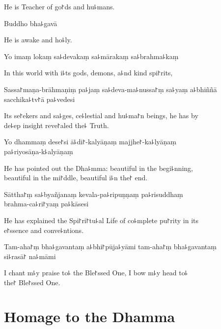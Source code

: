 \begin{english}
  He is Teacher of go꜓ds and hu꜕mans.
\end{english}

Buddho bha꜕gavā

\begin{english}
  He is awake and ho꜕ly.
\end{english}

Yo imaṃ lokaṃ sa꜕devakaṃ sa꜕mārakaṃ sa꜕brahma꜕kaṃ

\begin{english}
  In this world with i꜕ts gods, demons, a꜕nd kind spi꜓rits,
\end{english}

Sassa꜓maṇa-brāhmaṇiṃ pa꜕jaṃ sa꜕deva-ma꜕nussa꜓ṃ sa꜕yaṃ a꜕bhiññā sacchika꜕tv꜓ā pa꜕vedesi

\begin{english}
  Its se꜓ekers and sa꜕ges, ce꜕lestial and hu꜕ma꜓n beings, he has by \\de꜕ep insight reve꜓aled the꜕ Truth.
\end{english}

Yo dhammaṃ dese꜓si ā꜕di꜓-kalyāṇaṃ majjhe꜓-ka꜕lyāṇaṃ \\pa꜕riyosāṇa-k꜕alyāṇaṃ

\begin{english}
  He has pointed out the Dha꜕mma: beautiful in the begi꜕nning, \\beautiful in the mi꜓ddle, beautiful i꜕n the꜓ end.
\end{english}

Sāttha꜓ṃ sa꜕byañjanaṃ kevala-pa꜕ripuṇṇaṃ pa꜕risuddhaṃ \\brahma-ca꜕ri꜓yaṃ pa꜕kāsesi

\begin{english}
  He has explained the Spi꜓ri꜓tu꜕al Life of co꜕mplete pu꜓rity in its \\e꜓ssence and conve꜕ntions.
\end{english}

Tam-aha꜓ṃ bha꜕gavantaṃ a꜕bhi꜓pūja꜕yāmi tam-aha꜓ṃ bha꜕gavantaṃ \\si꜕rasā꜓ na꜕māmi

\begin{english}
  I chant m꜕y praise to꜕ the Ble꜓ssed One, I bow m꜕y head to꜕ \\the꜓ Ble꜓ssed One.
\end{english}

\clearpage

\chapter{Homage to the Dhamma}                      %

